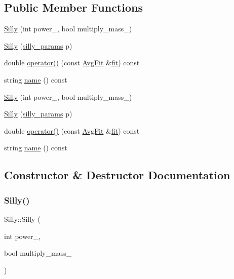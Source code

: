 \subsection*{Public Member Functions}
\begin{DoxyCompactItemize}
\item 
\mbox{\hyperlink{classSilly_aff8a69219d52c64960009dbfeee78fda}{Silly}} (int power\+\_\+, bool multiply\+\_\+mass\+\_\+)
\item 
\mbox{\hyperlink{classSilly_a38cdb22dcb5efdd420553d1fd6810b8e}{Silly}} (\mbox{\hyperlink{structsilly__params}{silly\+\_\+params}} p)
\item 
double \mbox{\hyperlink{classSilly_a7da4b46c49f85b3dbf91bbdcd7299b2c}{operator()}} (const \mbox{\hyperlink{classAvgFit}{Avg\+Fit}} \&\mbox{\hyperlink{src_2lib_2three__point__timeslice__fitting_8h_aa079c61e69a3946e3351db64a3478612}{fit}}) const
\item 
string \mbox{\hyperlink{classSilly_a090ed776bc4cf29f2ad8802242090b59}{name}} () const
\item 
\mbox{\hyperlink{classSilly_aff8a69219d52c64960009dbfeee78fda}{Silly}} (int power\+\_\+, bool multiply\+\_\+mass\+\_\+)
\item 
\mbox{\hyperlink{classSilly_a38cdb22dcb5efdd420553d1fd6810b8e}{Silly}} (\mbox{\hyperlink{structsilly__params}{silly\+\_\+params}} p)
\item 
double \mbox{\hyperlink{classSilly_a7da4b46c49f85b3dbf91bbdcd7299b2c}{operator()}} (const \mbox{\hyperlink{classAvgFit}{Avg\+Fit}} \&\mbox{\hyperlink{src_2lib_2three__point__timeslice__fitting_8h_aa079c61e69a3946e3351db64a3478612}{fit}}) const
\item 
string \mbox{\hyperlink{classSilly_a090ed776bc4cf29f2ad8802242090b59}{name}} () const
\end{DoxyCompactItemize}


\subsection{Constructor \& Destructor Documentation}
\mbox{\label{classSilly_aff8a69219d52c64960009dbfeee78fda}} 
\subsubsection{\texorpdfstring{Silly()}{Silly()}\hspace{0.1cm}{\footnotesize\ttfamily [1/4]}}
{\footnotesize\ttfamily Silly\+::\+Silly (\begin{DoxyParamCaption}\item[{int}]{power\+\_\+,  }\item[{bool}]{multiply\+\_\+mass\+\_\+ }\end{DoxyParamCaption})\hspace{0.3cm}{\ttfamily [inline]}}

